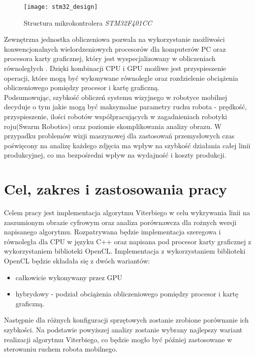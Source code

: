 \documentclass[document.tex]{subfiles}
\begin{document}
	\begin{figure}[h]
	\texttt{[image: stm32\_design]}
	\caption{Structura mikrokontrolera \textit{STM32F401CC}\protect\cite{STM32_microcontrollers}}
	\label{fig:stm32}
	\end{figure}

Zewnętrzna jednostka obliczeniowa pozwala na wykorzystanie możliwości konwencjonalnych wielordzeniowych procesorów dla komputerów PC oraz procesora karty graficznej, który jest wyspecjalizowany w obliczeniach równoległych\cite{GPU_vs_CPU_nvidia} \cite{Computer_Architecture_Patterson_Hennesy}\cite{GPUs_Closer_Look}. 
Dzięki kombinacji CPU i GPU możliwe jest przyspieszenie operacji,
które mogą być wykonywane równolegle oraz rozdzielenie obciążenia obliczeniowego pomiędzy
procesor i kartę graficzną. \\
\indent Podsumowując, szybkość obliczeń systemu wizyjnego w robotyce mobilnej decyduje o tym jakie
mogą być maksymalne parametry ruchu robota - prędkość, przyspieszenie, ilości robotów współpracujących w zagadnieniach robotyki roju(Swarm Robotics) oraz poziomie skomplikowania
analizy obrazu. W przypadku problemów wizji maszynowej dla zastosowań przemysłowych czas poświęcony na analizę każdego zdjęcia ma wpływ na szybkość działania całej linii produkcyjnej, co ma bezpośredni wpływ na wydajność i koszty produkcji.  
\clearpage
\section{Cel, zakres i zastosowania pracy}
\indent Celem pracy jest implementacja algorytmu Viterbiego w celu wykrywania linii na zaszumionym obrazie cyfrowym oraz analiza porównawcza dla rożnych wersji napisanego algorytmu.
Rozpatrywana będzie implementacja szeregowa i równoległa dla CPU w języku C++ oraz 
napisana pod procesor karty graficznej z wykorzystaniem biblioteki OpenCL. Implementacja
z wykorzystaniem biblioteki OpenCL będzie składała się z dwóch wariantów:
\begin{itemize}
	\item całkowicie wykonywany przez GPU
	\item hybrydowy - podział obciążenia obliczeniowego pomiędzy procesor i kartę graficzną.
\end{itemize} 
Następnie dla różnych konfiguracji sprzętowych zostanie zrobione porównanie ich szybkości.
Na podstawie powyższej analizy zostanie wybrany najlepszy wariant realizacji 
algorytmu Viterbiego, co będzie mogło być później zastosowane w sterowaniu ruchem robota
mobilnego.  
\end{document}
